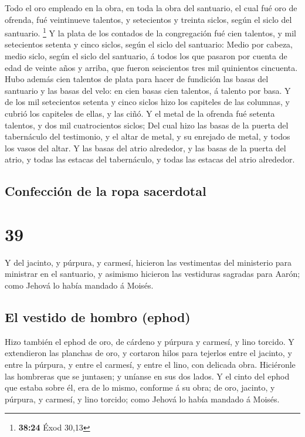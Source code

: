  Todo el oro empleado en la obra, en toda la obra del
santuario, el cual fué oro de ofrenda, fué veintinueve talentos, y
setecientos y treinta siclos, según el siclo del santuario. \footnote{\textbf{38:24}
  Éxod 30,13}  Y la plata de los contados de la
congregación fué cien talentos, y mil setecientos setenta y cinco
siclos, según el siclo del santuario:  Medio por cabeza,
medio siclo, según el siclo del santuario, á todos los que pasaron por
cuenta de edad de veinte años y arriba, que fueron seiscientos tres mil
quinientos cincuenta.  Hubo además cien talentos de plata
para hacer de fundición las basas del santuario y las basas del velo: en
cien basas cien talentos, á talento por basa.  Y de los mil
setecientos setenta y cinco siclos hizo los capiteles de las columnas, y
cubrió los capiteles de ellas, y las ciñó.  Y el metal de
la ofrenda fué setenta talentos, y dos mil cuatrocientos siclos;
 Del cual hizo las basas de la puerta del tabernáculo del
testimonio, y el altar de metal, y su enrejado de metal, y todos los
vasos del altar.  Y las basas del atrio alrededor, y las
basas de la puerta del atrio, y todas las estacas del tabernáculo, y
todas las estacas del atrio alrededor.

\hypertarget{confecciuxf3n-de-la-ropa-sacerdotal}{%
\subsection{Confección de la ropa
sacerdotal}\label{confecciuxf3n-de-la-ropa-sacerdotal}}

\hypertarget{section-38}{%
\section{39}\label{section-38}}

 Y del jacinto, y púrpura, y carmesí, hicieron las
vestimentas del ministerio para ministrar en el santuario, y asimismo
hicieron las vestiduras sagradas para Aarón; como Jehová lo había
mandado á Moisés.

\hypertarget{el-vestido-de-hombro-ephod-1}{%
\subsection{El vestido de hombro
(ephod)}\label{el-vestido-de-hombro-ephod-1}}

 Hizo también el ephod de oro, de cárdeno y púrpura y
carmesí, y lino torcido.  Y extendieron las planchas de oro,
y cortaron hilos para tejerlos entre el jacinto, y entre la púrpura, y
entre el carmesí, y entre el lino, con delicada obra. 
Hiciéronle las hombreras que se juntasen; y uníanse en sus dos lados.
 Y el cinto del ephod que estaba sobre él, era de lo mismo,
conforme á su obra; de oro, jacinto, y púrpura, y carmesí, y lino
torcido; como Jehová lo había mandado á Moisés.

